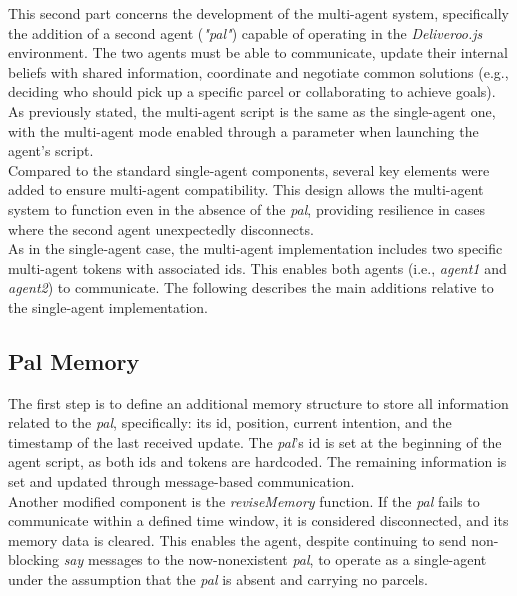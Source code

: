     This second part concerns the development of the multi-agent system, specifically the addition of a second agent (\textit{"pal"}) capable of operating in the \textit{Deliveroo.js} environment. The two agents must be able to communicate, update their internal beliefs with shared information, coordinate and negotiate common solutions (e.g., deciding who should pick up a specific parcel or collaborating to achieve goals).
    \medskip\\ 
    As previously stated, the multi-agent script is the same as the single-agent one, with the multi-agent mode enabled through a parameter when launching the agent's script.
    \medskip\\
    Compared to the standard single-agent components, several key elements were added to ensure multi-agent compatibility. This design allows the multi-agent system to function even in the absence of the \textit{pal}, providing resilience in cases where the second agent unexpectedly disconnects.
    \medskip\\
    As in the single-agent case, the multi-agent implementation includes two specific multi-agent tokens with associated ids. This enables both agents (i.e., \textit{agent1} and \textit{agent2}) to communicate. The following describes the main additions relative to the single-agent implementation.

    \subsection{Pal Memory}
        The first step is to define an additional memory structure to store all information related to the \textit{pal}, specifically: its id, position, current intention, and the timestamp of the last received update. The \textit{pal}'s id is set at the beginning of the agent script, as both ids and tokens are hardcoded. The remaining information is set and updated through message-based communication.
        \medskip\\
        Another modified component is the \textit{reviseMemory} function. If the \textit{pal} fails to communicate within a defined time window, it is considered disconnected, and its memory data is cleared. This enables the agent, despite continuing to send non-blocking \textit{say} messages to the now-nonexistent \textit{pal}, to operate as a single-agent under the assumption that the \textit{pal} is absent and carrying no parcels.

